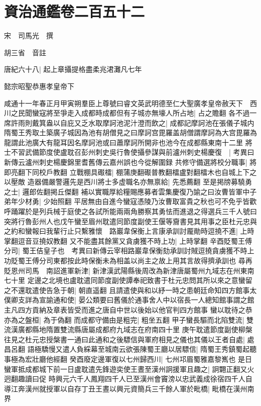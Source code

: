 \section{資治通鑑卷二百五十二}
宋　司馬光　撰

胡三省　音註

唐紀六十八|{
	起上章攝提格盡柔兆涒灘凡七年}


懿宗昭聖恭惠孝皇帝下

咸通十一年春正月甲寅朔羣臣上尊號曰睿文英武明德至仁大聖廣孝皇帝赦天下　西川之民聞蠻寇將至爭走入成都時成都但有子城亦無壕人所占地|{
	占之贍翻}
各不過一席許雨則戴箕盎以自庇又乏水取摩訶池泥汁澄而飲之|{
	成都記摩訶池在張儀子城内隋蜀王秀取土築廣子城因為池有胡僧見之曰摩訶宫毘羅盖胡僧謂摩訶為大宫毘羅為龍謂此池廣大有龍耳因名摩訶池或曰蕭摩訶所開非也池今在成都縣東南十二里}
將士不習武備節度使盧耽召彭州刺史吳行魯使攝參謀與前瀘州刺史楊慶復　|{
	考異曰新傳云瀘州刺史楊慶錦里耆舊傳云嘉州誤也今從解圍録}
共修守備選將校分職事|{
	將即亮翻下同校戶教翻}
立戰棚具礟檑|{
	棚蒲庚翻礟普教翻檑盧對翻檑木也自城上下之以壓敵}
造器備嚴警邏先是西川將士多虚職名亦無禀給|{
	先悉薦翻}
至是掲牓募驍勇之士|{
	邏郎佐翻掲丘傑翻}
補以實職厚給糧賜應募者雲集慶復乃諭之曰汝曹皆軍中子弟年少材勇|{
	少始照翻}
平居無由自進今蠻寇憑陵乃汝曹取富貴之秋也可不免乎皆歡呼踊躍於是列兵械于庭使之各試所能兩兩角勝察其勇怯而進退之得選兵三千人號曰突將行魯彭州人也戊午蠻至眉州耽遣同節度副使王偃等齎書見其用事之臣杜元忠與之約和蠻報曰我輩行止只繫雅懷　路巖韋保衡上言康承訓討龎勛時逗撓不進|{
	上時掌翻逗音豆撓奴教翻}
又不能盡其餘黨又貪虜獲不時上功|{
	上時掌翻}
辛酉貶蜀王傅分司|{
	蜀王佶皇子也　考異曰新傳云宰相路巖韋保衡劾承訓討賊逗撓貪虜獲不時上功貶蜀王傅分司東都按此時保衡未為相盖以尚主之故上用其言故得擠承訓也}
尋再貶恩州司馬　南詔進軍新津|{
	新津漢武陽縣後周改為新津唐屬蜀州九域志在州東南七十里}
定邊之北境也盧耽遣同節度副使譚奉祀致書于杜元忠問其所以來之意蠻留之不還耽遣使告急于朝|{
	朝直遥翻}
且請遣使與和以紓一時之患朝廷命知四方館事太僕卿支詳為宣諭通和使|{
	晏公類要曰舊儀於通事舍人中以宿長一人總知館事謂之館主凡四方貢納及章表皆受而進之唐自中世以後始以他官判四方館事}
蠻以耽待之恭亦為之盤桓|{
	為于偽翻}
而成都守備由是粗完|{
	粗坐五翻}
甲子蠻長驅而北陷雙流|{
	雙流漢廣都縣地隋置雙流縣唐屬成都府九域志在府南四十里}
庚午耽遣節度副使柳槃往見之杜元忠授槃書一通曰此通和之後驃信與軍府相見之儀也其儀以王者自處|{
	處昌呂翻}
語極驕慢又遣人負綵幕至城南云欲張陳蜀王廳以居驃信|{
	隋蜀王秀鎮蜀起聽事極為宏壯廳他經翻}
癸酉廢定邊軍復以七州歸西川|{
	七州邛眉蜀雅嘉黎嶲也}
是日蠻軍抵成都城下前一日盧耽遣先鋒遊奕使王晝至漢州詗援軍且趣之|{
	詗翾正翻又火迥翻趣讀曰促}
時興元六千人鳳翔四千人已至漢州會竇滂以忠武義成徐宿四千人自導江奔漢州就授軍以自存丁丑王晝以興元資簡兵三千餘人軍於毗橋|{
	毗橋在漢州南界}
